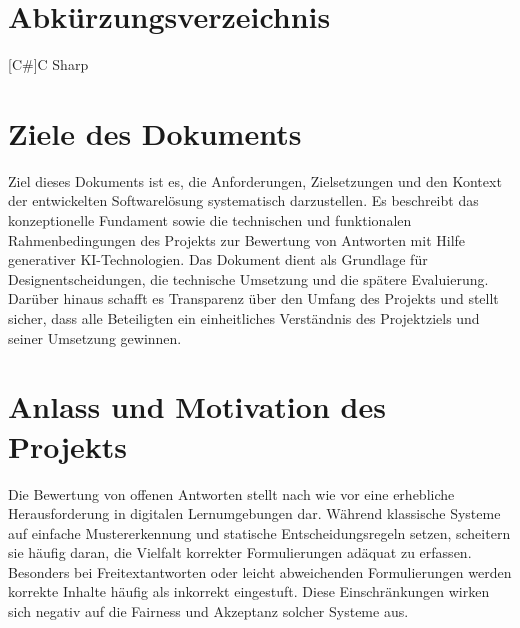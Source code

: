 \documentclass[a4paper,12pt]{article}
\begin{document}
\newpage
\tableofcontents
\thispagestyle{fancy}
\thispagestyle{firstpage}
\newpage

\listoffigures

\newpage
\listoftables
\newpage
\section*{Abkürzungsverzeichnis}
\begin{acronym}
  [C\#]{C Sharp}
  
  
\end{acronym}

\newpage

\setcounter{page}{1}

\section{Ziele des Dokuments}
Ziel dieses Dokuments ist es, die Anforderungen, Zielsetzungen und den Kontext der entwickelten Softwarelösung systematisch darzustellen. Es beschreibt das konzeptionelle Fundament sowie die technischen und funktionalen Rahmenbedingungen des Projekts zur Bewertung von Antworten mit Hilfe generativer KI-Technologien. Das Dokument dient als Grundlage für Designentscheidungen, die technische Umsetzung und die spätere Evaluierung. Darüber hinaus schafft es Transparenz über den Umfang des Projekts und stellt sicher, dass alle Beteiligten ein einheitliches Verständnis des Projektziels und seiner Umsetzung gewinnen.

\section{Anlass und Motivation des Projekts}
Die Bewertung von offenen Antworten stellt nach wie vor eine erhebliche Herausforderung in digitalen Lernumgebungen dar. Während klassische Systeme auf einfache Mustererkennung und statische Entscheidungsregeln setzen, scheitern sie häufig daran, die Vielfalt korrekter Formulierungen adäquat zu erfassen. Besonders bei Freitextantworten oder leicht abweichenden Formulierungen werden korrekte Inhalte häufig als inkorrekt eingestuft. Diese Einschränkungen wirken sich negativ auf die Fairness und Akzeptanz solcher Systeme aus.
\end{document}
